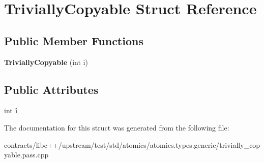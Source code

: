 \hypertarget{struct_trivially_copyable}{}\section{Trivially\+Copyable Struct Reference}
\label{struct_trivially_copyable}
\subsection*{Public Member Functions}
\begin{DoxyCompactItemize}
\item 
\mbox{\label{struct_trivially_copyable_a9ee5c43ef198e6fbe2723e0a8d21edca}} 
{\bfseries Trivially\+Copyable} (int i)
\end{DoxyCompactItemize}
\subsection*{Public Attributes}
\begin{DoxyCompactItemize}
\item 
\mbox{\label{struct_trivially_copyable_a6a16b3c0011a2312eddfcc582d8d35cf}} 
int {\bfseries i\+\_\+}
\end{DoxyCompactItemize}


The documentation for this struct was generated from the following file\+:\begin{DoxyCompactItemize}
\item 
contracts/libc++/upstream/test/std/atomics/atomics.\+types.\+generic/trivially\+\_\+copyable.\+pass.\+cpp\end{DoxyCompactItemize}

